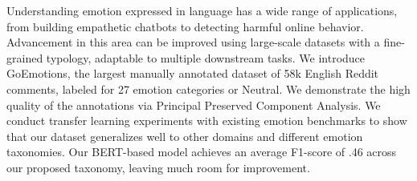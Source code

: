 Understanding emotion expressed in language has a wide range of applications, from building empathetic chatbots to detecting harmful online behavior.  Advancement in this area can be improved using large-scale datasets with a fine-grained typology, adaptable to multiple downstream tasks. We introduce GoEmotions, the largest manually annotated dataset of 58k English Reddit comments, labeled for 27 emotion categories or Neutral. We demonstrate the high quality of the annotations via Principal Preserved Component Analysis. We conduct transfer learning experiments with existing emotion benchmarks to show that our dataset generalizes well to other domains and different emotion taxonomies. Our BERT-based model achieves an average F1-score of .46 across our proposed taxonomy, leaving much room for improvement.
